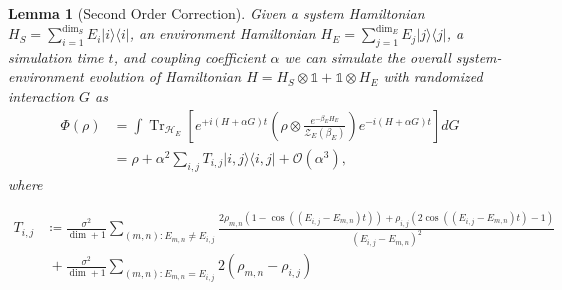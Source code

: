 \documentclass{article}
\newtheorem{lemma}[theorem]{Lemma}
\newcommand{\ketbra}[2]{| #1\rangle\! \langle #2|}
\newcommand{\parens}[1]{\left( #1 \right)}
\newcommand{\brackets}[1]{\left[ #1 \right]}
\newcommand{\bigo}[1]{\mathcal{O}\left( #1 \right)}
\DeclareMathOperator{\Tr}{Tr}
\newcommand{\partrace}[2]{\Tr_{#1} \brackets{ #2 }}
\newcommand{\partfun}{\mathcal{Z}}
\newcommand{\identity}{\mathds{1}}
\begin{document}
\begin{lemma}[Second Order Correction]
    Given a system Hamiltonian $H_{S} = \sum_{i = 1}^{\dim_S} E_i \ketbra{i}{i}$, an environment Hamiltonian $H_{E} = \sum_{j = 1}^{\dim_E} E_j \ketbra{j}{j}$, a simulation time $t$, and coupling coefficient $\alpha$ we can simulate the overall system-environment evolution of Hamiltonian $H = H_S \otimes \identity + \identity \otimes H_E$ with randomized interaction $G$ as
    \begin{align}
        \Phi(\rho) &= \int  \partrace{\mathcal{H}_E}{e^{+i (H + \alpha G)t} \parens{\rho \otimes \frac{e^{-\beta_E H_E}}{\partfun_E(\beta_E)} } e^{-i (H + \alpha G) t} } dG \\
        &= \rho + \alpha^2 \sum_{i,j} T_{i,j} \ketbra{i,j}{i,j} + \bigo{\alpha^3},
    \end{align}
    where 
    
    \begin{align}
        T_{i,j} &\coloneqq \frac{\sigma^2}{\dim + 1} \sum_{(m,n) : E_{m,n} \neq E_{i,j}} \frac{2 \rho_{m,n}(1 - \cos ((E_{i,j} - E_{m,n})t)) + \rho_{i,j} (2 \cos ((E_{i,j} - E_{m,n})t) - 1 )}{(E_{i,j} - E_{m,n})^2} \\
        &~ + \frac{\sigma^2}{\dim + 1} \sum_{(m,n) : E_{m,n} = E_{i,j}} 2 (\rho_{m,n} - \rho_{i,j})
    \end{align}
\end{lemma}
\end{document}
